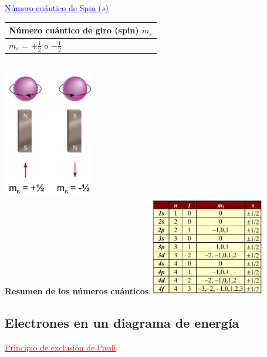         \begin{center} \textcolor{blue}{\underline{Número cuántico de Spin ($s$)}} \end{center}
            \begin{center} 
                \begin{tabular}{| >{\centering\arraybackslash}m{6cm} |}
                    \hline
                    Número cuántico de giro (spin)  $m_s$ \\
                    \hline
                    \hline
                    \vspace{1mm}
                    $m_s$ = $+ \frac{1}{2}$ o $- \frac{1}{2}$ \\[4pt]
                    \hline
                \end{tabular} \\[5pt]
                \includegraphics[width=4cm]{./imagenes/spinGiro.png} \\[10pt]

                \textbf{Resumen de los números cuánticos}
                \includegraphics[width=5cm]{./imagenes/tablaNumerosCuanticos.png}
            \end{center}

    \subsection{Electrones en un diagrama de energía}
        \begin{center} \textcolor{red}{\underline{Principio de exclusión de Pauli}} \end{center}

